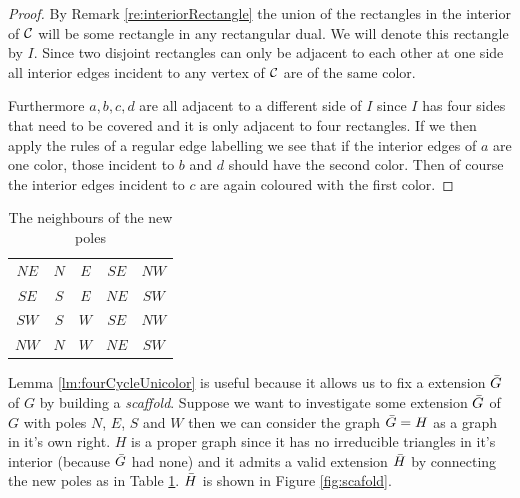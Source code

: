 \begin{proof}
By Remark \ref{re:interiorRectangle} the union of the rectangles in the interior of $\mathcal{C}$ will be some rectangle in any rectangular dual. We will denote this rectangle by $I$. Since two disjoint rectangles can only be adjacent to each other at one side all interior edges incident to any vertex of $\mathcal{C}$ are of the same color.

Furthermore $a, b, c, d$ are all adjacent to a different side of $I$ since $I$ has four sides that need to be covered and it is only adjacent to four rectangles. If we then apply the rules of a regular edge labelling we see that if the interior edges of $a$ are one color, those incident to $b$ and $d$ should have the second color. Then of course the interior edges incident to $c$ are again coloured with the first color.

\end{proof}


\begin{table}
  \centering
  \begin{tabular}{c|| c c c c}
    $NE$ & $N$ & $ E$ & $ SE$ & $ NW$ \\
    $SE$ & $S$ & $ E$ & $ NE$ & $ SW$\\
    $SW$ & $S$ & $ W$ & $ SE$ & $ NW$\\
    $NW$ & $N$ & $ W$ & $ NE$ & $ SW$\\
  \end{tabular}
  \caption{The neighbours of the new poles}
  \label{tab:scaffold}
\end{table}

Lemma \ref{lm:fourCycleUnicolor} is useful because it allows us to fix a extension $\bar{G}$ of $G$ by building a \emph{scaffold}. Suppose we want to investigate some extension $\bar{G}$ of $G$ with poles $N$, $E$, $S$ and $W$ then we can consider the graph $\bar{G} = H$ as a graph in it's own right. $H$ is a proper graph since it has no irreducible triangles in it's interior (because $\bar{G}$ had none) and it admits a valid extension $\bar{H}$ by connecting the new poles as in Table \ref{tab:scaffold}. $\bar{H}$ is shown in Figure \ref{fig:scafold}.

